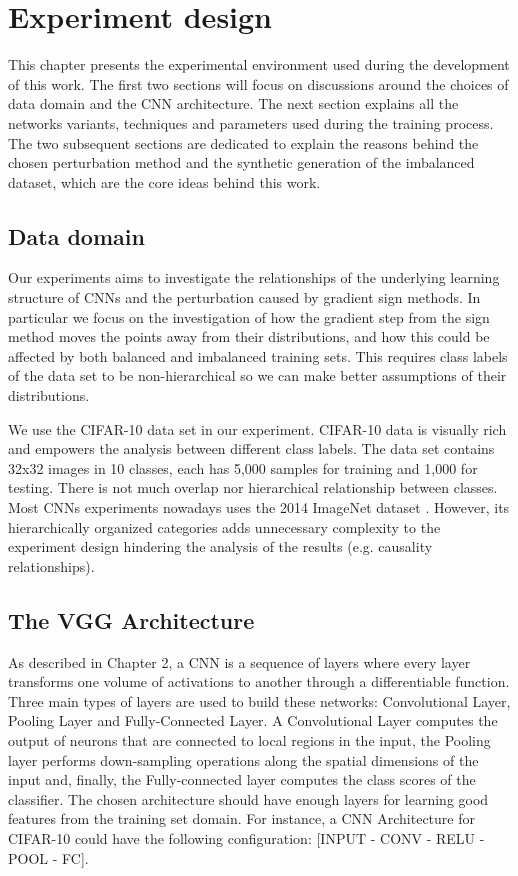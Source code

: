 \chapter{Experiment design}

This chapter presents the experimental environment used during the development of this work. The first two sections will focus on discussions around the choices of data domain and the CNN architecture. The next section explains all the networks variants, techniques and parameters used during the training process. The two subsequent sections are dedicated to explain the reasons behind the chosen perturbation method and the synthetic generation of the imbalanced dataset, which are the core ideas behind this work.
\section{Data domain}

Our experiments aims to investigate the relationships of the underlying learning structure of CNNs and the perturbation caused by gradient sign methods. In particular we focus on the investigation of how the gradient step from the sign method moves the points away from their distributions, and how this could be affected by both balanced and imbalanced training sets. This requires  class labels of the data set to be non-hierarchical so we can make better assumptions of their distributions. 

We use the CIFAR-10 data set \cite{krizhevsky_2009} in our experiment. CIFAR-10 data is visually rich and empowers the analysis between different class labels. The data set contains 32x32 images in 10 classes, each has 5,000 samples for training and 1,000 for testing. There is not much overlap nor hierarchical relationship between classes. Most CNNs experiments nowadays uses the 2014 ImageNet dataset \cite{deng2009imagenet}. However, its hierarchically organized categories adds unnecessary complexity to the experiment design hindering the analysis of the results (e.g. causality relationships).
\section{The VGG Architecture}

As described in Chapter 2, a CNN is a sequence of layers where every layer transforms one volume of activations to another through a differentiable function. Three main types of layers are used to build these networks: Convolutional Layer, Pooling Layer and Fully-Connected Layer. A Convolutional Layer computes the output of neurons that are connected to local regions in the input, the Pooling layer performs down-sampling operations along the spatial dimensions of the input and, finally, the Fully-connected layer computes the class scores of the classifier. The chosen architecture should have enough layers for learning good features from the training set domain. For instance, a CNN Architecture for CIFAR-10 could have the following configuration: [INPUT - CONV - RELU - POOL - FC].

